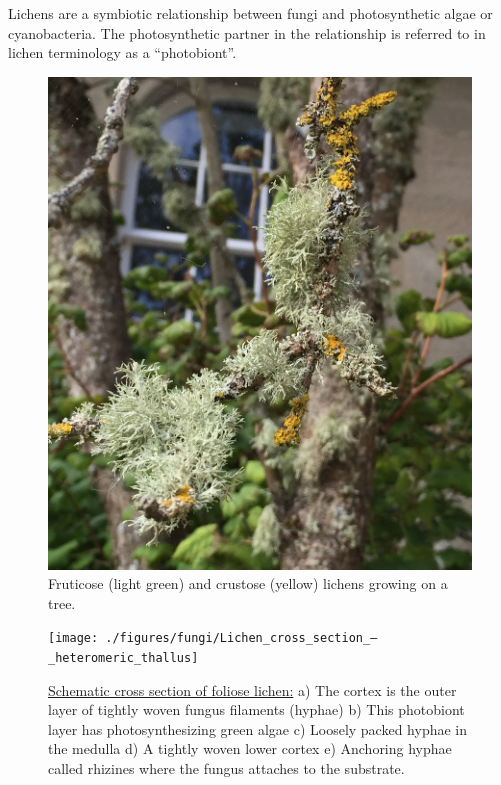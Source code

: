 Lichens are a symbiotic relationship between fungi and photosynthetic algae or cyanobacteria. The photosynthetic partner in the relationship is referred to in lichen terminology as a ``photobiont''.



\begin{figure}

{\centering \includegraphics[width=0.7\linewidth]{./figures/fungi/lichen} 

}

\caption{Fruticose (light green) and crustose (yellow) lichens growing on a tree.}\label{fig:lichen}
\end{figure}



\begin{figure}

{\centering \texttt{[image: ./figures/fungi/Lichen\_cross\_section\_–\_heteromeric\_thallus]} 

}

\caption{\href{https://commons.wikimedia.org/wiki/File:Lichen_cross_section_–_heteromeric_thallus.svg}{Schematic cross section of foliose lichen:} a) The cortex is the outer layer of tightly woven fungus filaments (hyphae) b) This photobiont layer has photosynthesizing green algae c) Loosely packed hyphae in the medulla d) A tightly woven lower cortex e) Anchoring hyphae called rhizines where the fungus attaches to the substrate.}\label{fig:lichencrossection}
\end{figure}

